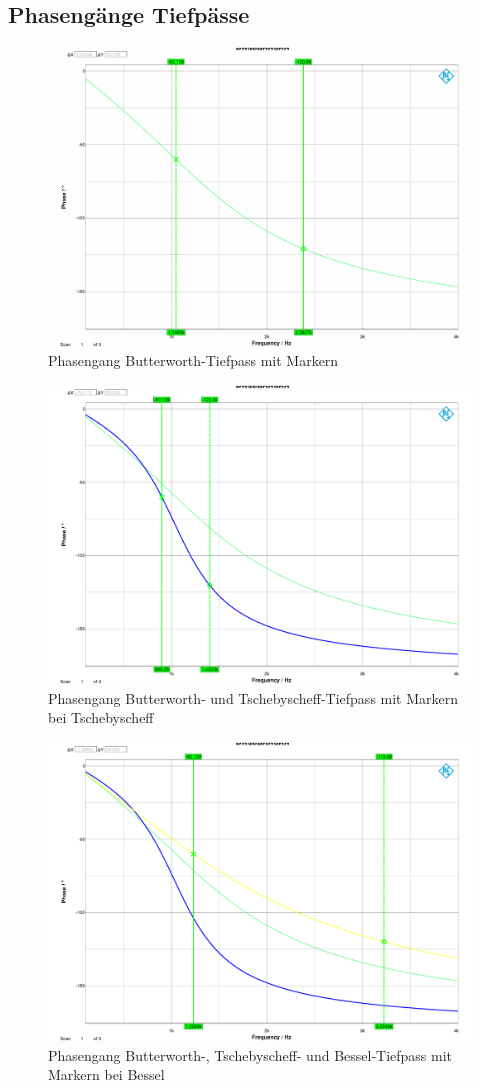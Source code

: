 \clearpage

\subsection{Phasengänge Tiefpässe}

\begin{figure}[h]
\centering
\includegraphics[width=0.60\linewidth]{Bilder/ImLabor/Phasengang_4_1_Butter_TP}
\caption{Phasengang Butterworth-Tiefpass mit Markern}
\label{fig:Phasengang_4_1_Butter_TP}
\end{figure}

\begin{figure}[h]
\centering
\includegraphics[width=0.60\linewidth]{Bilder/ImLabor/Phasengang_4_2_Tscheby_TP}
\caption{Phasengang Butterworth- und Tschebyscheff-Tiefpass mit Markern bei Tschebyscheff}
\label{fig:Phasengang_4_2_Tscheby_TP}
\end{figure}

\begin{figure}[h]
\centering
\includegraphics[width=0.60\linewidth]{Bilder/ImLabor/Phasengang_4_3_Bessel_TP_Alle}
\caption{Phasengang Butterworth-, Tschebyscheff- und Bessel-Tiefpass mit Markern bei Bessel}
\label{fig:Phasengang_4_3_Bessel_TP_Alle}
\end{figure}

